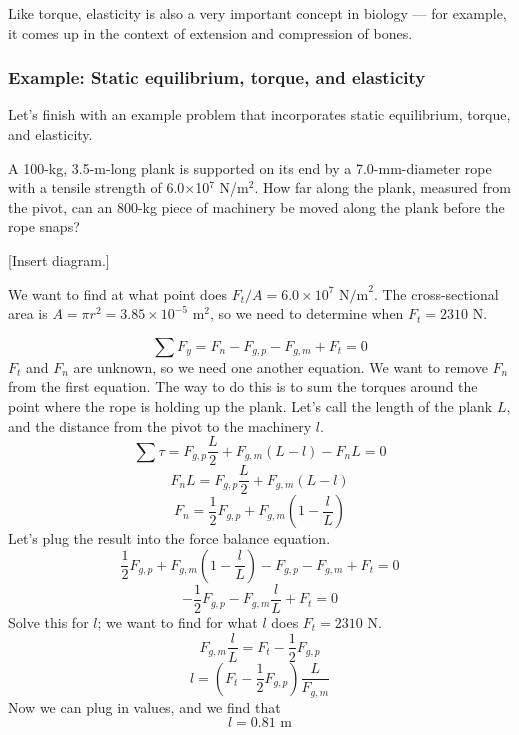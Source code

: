 Like torque, elasticity is also a very important concept in biology --- for example, it comes up in the context of extension and compression of bones.

\subsubsection{Example: Static equilibrium, torque, and elasticity}
Let's finish with an example problem that incorporates static equilibrium, torque, and elasticity.

A 100-kg, 3.5-m-long plank is supported on its end by a 7.0-mm-diameter rope with a tensile strength of 6.0$\times$10$^7$ N/m$^2$. How far along the plank, measured from the pivot, can an 800-kg piece of machinery be moved along the plank before the rope snaps?

[Insert diagram.]
\clearpage

We want to find at what point does $F_t/A=6.0\times 10^7\mbox{ N/m}^2$. The cross-sectional area is $A=\pi r^2=3.85\times 10^{-5}\mbox{ m}^2$, so we need to determine when $F_t=2310\mbox{ N}$.

$$\sum F_y=F_n-F_{g,p}-F_{g,m}+F_t=0$$
$F_t$ and $F_n$ are unknown, so we need one another equation. We want to remove $F_n$ from the first equation. The way to do this is to sum the torques around the point where the rope is holding up the plank. Let's call the length of the plank $L$, and the distance from the pivot to the machinery $l$.
$$\sum \tau=F_{g,p}\frac{L}{2}+F_{g,m}(L-l)-F_nL=0$$
$$F_nL=F_{g,p}\frac{L}{2}+F_{g,m}(L-l)$$
$$F_n=\frac{1}{2}F_{g,p}+F_{g,m}\left(1-\frac{l}{L}\right)$$
Let's plug the result into the force balance equation.
$$\frac{1}{2}F_{g,p}+F_{g,m}\left(1-\frac{l}{L}\right)-F_{g,p}-F_{g,m}+F_t=0$$
$$-\frac{1}{2}F_{g,p}-F_{g,m}\frac{l}{L}+F_t=0$$
Solve this for $l$; we want to find for what $l$ does $F_t=2310\mbox{ N}$.
$$F_{g,m}\frac{l}{L}=F_t-\frac{1}{2}F_{g,p}$$
$$l=\left(F_t-\frac{1}{2}F_{g,p}\right)\frac{L}{F_{g,m}}$$
Now we can plug in values, and we find that
$$\boxed{l=0.81\mbox{ m}}$$


\clearpage
